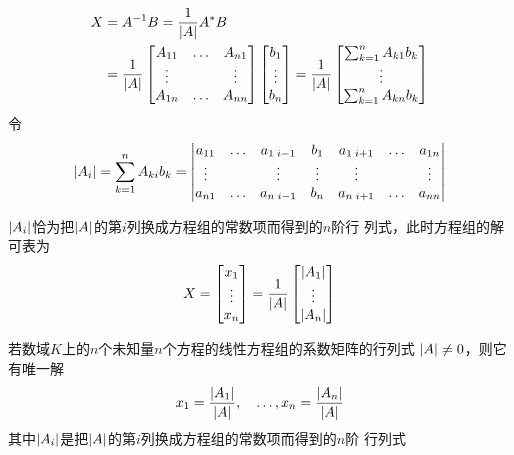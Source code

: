 \documentclass[11pt]{article}
\begin{document}
\begin{align*}
X&=A^{-1}B=\frac{1}{\abs{A}}A^*B\\
&=
\frac{1}{\abs{A}}
\begin{bmatrix}
A_{11}&\dots&A_{n1}\\
\vdots&&\vdots\\
A_{1n}&\dots&A_{nn}
\end{bmatrix}
\begin{bmatrix}
b_1\\\vdots\\b_n
\end{bmatrix}=
\frac{1}{\abs{A}}
\begin{bmatrix}
\sum_{k=1}^nA_{k1}b_k\\\vdots\\
\sum_{k=1}^nA_{kn}b_k
\end{bmatrix}
\end{align*}
令
\begin{equation*}
\abs{A_i}=\sum_{k=1}^nA_{ki}b_k=
\begin{vmatrix}
a_{11}&\dots&a_{1\;i-1}&b_1&a_{1\;i+1}&\dots&a_{1n}\\
\vdots&&\vdots&\vdots&\vdots&&\vdots\\
a_{n1}&\dots&a_{n\;i-1}&b_n&a_{n\;i+1}&\dots&a_{nn}
\end{vmatrix}
\end{equation*}

\(\abs{A_i}\)恰为把\(\abs{A}\)的第\(i\)列换成方程组的常数项而得到的\(n\)阶行
列式，此时方程组的解可表为
\begin{equation*}
X=
\begin{bmatrix}
x_1\\\vdots\\x_n
\end{bmatrix}=
\frac{1}{\abs{A}}
\begin{bmatrix}
\abs{A_1}\\\vdots\\\abs{A_n}
\end{bmatrix}
\end{equation*}
\begin{theorem}
若数域\(K\)上的\(n\)个未知量\(n\)个方程的线性方程组的系数矩阵的行列式
\(\abs{A}\neq0\)，则它有唯一解
\begin{equation*}
x_1=\frac{\abs{A_1}}{\abs{A}},\quad\dots,
x_n=\frac{\abs{A_n}}{\abs{A}}
\end{equation*}
其中\(\abs{A_i}\)是把\(\abs{A}\)的第\(i\)列换成方程组的常数项而得到的\(n\)阶
行列式 
\end{theorem}
\end{document}
